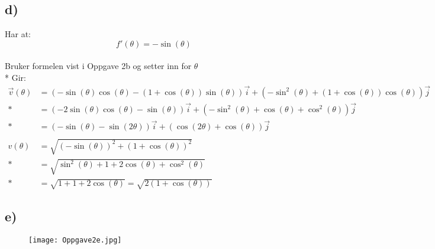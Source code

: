 \documentclass[a4paper, norsk, twoside, 10pt]{article}
\begin{document}
  \subsection*{d)}
  Har at: \[f'(\theta) = -\sin(\theta)\]\\
  Bruker formelen vist i Oppgave 2b og setter inn for $\theta$ \\* Gir:
  \[
    \begin{split}
      \vec{v}(\theta) &= (-\sin(\theta)\cos(\theta) - (1 + \cos(\theta))\sin(\theta))\vec{i} + (-\sin^{2}(\theta) + (1 + \cos(\theta))\cos(\theta))\vec{j}\\*
      &= (-2\sin(\theta)\cos(\theta)-\sin(\theta))\vec{i} + (-\sin^{2}(\theta) + \cos(\theta) + \cos^{2}(\theta))\vec{j} \\*
      &= (-\sin(\theta) -\sin(2\theta))\vec{i} + (\cos(2\theta) +\cos(\theta))\vec{j}\\
      \\
      v(\theta) &= \sqrt{(-\sin(\theta))^{2} + (1+ \cos(\theta))^{2}}\\*
      &= \sqrt{\sin^{2}(\theta) + 1 + 2\cos(\theta) + \cos^{2}(\theta)} \\*
      &= \sqrt{1 + 1 + 2\cos(\theta)} = \sqrt{2(1 + \cos(\theta))}
    \end{split}
  \]

  \subsection*{e)}
      \begin{figure}[H]
    \begin{center}
    \texttt{[image: Oppgave2e.jpg]}
    \end {center}
    \end{figure}

   
\end{document}
